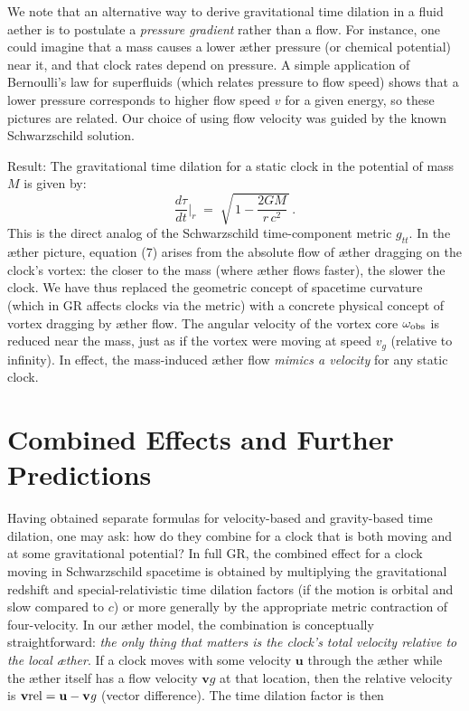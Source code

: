 \documentclass[aps,preprint,superscriptaddress]{revtex4}
\begin{document}
We note that an alternative way to derive gravitational time dilation in a fluid aether is to postulate a \textit{pressure gradient} rather than a flow. For instance, one could imagine that a mass causes a lower æther pressure (or chemical potential) near it, and that clock rates depend on pressure. A simple application of Bernoulli’s law for superfluids (which relates pressure to flow speed) shows that a lower pressure corresponds to higher flow speed $v$ for a given energy, so these pictures are related. Our choice of using flow velocity was guided by the known Schwarzschild solution.


Result: The gravitational time dilation for a static clock in the potential of mass $M$ is given by:
\begin{equation}
\boxed{\frac{d\tau}{dt}\Big|_{r} \;=\; \sqrt{\,1-\frac{2GM}{r\,c^2}\,}\,.} \tag{7}
\end{equation}
This is the direct analog of the Schwarzschild time-component metric $g_{tt}$. In the æther picture, equation (7) arises from the absolute flow of æther dragging on the clock’s vortex: the closer to the mass (where æther flows faster), the slower the clock. We have thus replaced the geometric concept of spacetime curvature (which in GR affects clocks via the metric) with a concrete physical concept of vortex dragging by æther flow. The angular velocity of the vortex core $\omega_{\rm obs}$ is reduced near the mass, just as if the vortex were moving at speed $v_g$ (relative to infinity). In effect, the mass-induced æther flow \textit{mimics a velocity} for any static clock.


\section*{Combined Effects and Further Predictions}

Having obtained separate formulas for velocity-based and gravity-based time dilation, one may ask: how do they combine for a clock that is both moving and at some gravitational potential? In full GR, the combined effect for a clock moving in Schwarzschild spacetime is obtained by multiplying the gravitational redshift and special-relativistic time dilation factors (if the motion is orbital and slow compared to $c$) or more generally by the appropriate metric contraction of four-velocity. In our æther model, the combination is conceptually straightforward: \textit{the only thing that matters is the clock’s total velocity relative to the local æther}. If a clock moves with some velocity $\mathbf{u}$ through the æther while the æther itself has a flow velocity $\mathbf{v}\textit{g}$ at that location, then the relative velocity is $\mathbf{v}{\rm rel} = \mathbf{u} - \mathbf{v}\textit{g}$ (vector difference). The time dilation factor is then
\end{document}
